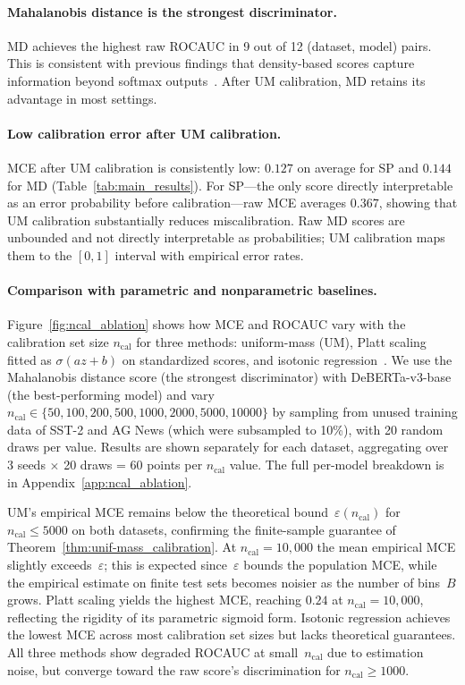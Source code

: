 \documentclass{article}
\theoremstyle{plain}
\theoremstyle{definition}
\theoremstyle{remark}
\begin{document}
\paragraph{Mahalanobis distance is the strongest discriminator.}
MD achieves the highest raw ROCAUC in 9 out of 12 (dataset, model) pairs.
This is consistent with previous findings that density-based scores capture information beyond softmax outputs~\citep{vazhentsev_uncertainty_2022}.
After UM calibration, MD retains its advantage in most settings.

\paragraph{Low calibration error after UM calibration.}
MCE after UM calibration is consistently low: $0.127$ on average for SP and $0.144$ for MD (Table~\ref{tab:main_results}).
For SP---the only score directly interpretable as an error probability before calibration---raw MCE averages $0.367$, showing that UM calibration substantially reduces miscalibration.
Raw MD scores are unbounded and not directly interpretable as probabilities; UM calibration maps them to the $[0,1]$ interval with empirical error rates.

\paragraph{Comparison with parametric and nonparametric baselines.}
Figure~\ref{fig:ncal_ablation} shows how MCE and ROCAUC vary with the calibration set size $n_{\mathrm{cal}}$ for three methods: uniform-mass (UM), Platt scaling~\citep{plat_scaling} fitted as $\sigma(a z + b)$ on standardized scores, and isotonic regression~\citep{isotonic}.
We use the Mahalanobis distance score (the strongest discriminator) with DeBERTa-v3-base (the best-performing model) and vary $n_{\mathrm{cal}} \in \{50, 100, 200, 500, 1000, 2000, 5000, 10000\}$ by sampling from unused training data of SST-2 and AG News (which were subsampled to 10\%), with 20 random draws per value.
Results are shown separately for each dataset, aggregating over 3 seeds $\times$ 20 draws = 60 points per $n_{\mathrm{cal}}$ value.
The full per-model breakdown is in Appendix~\ref{app:ncal_ablation}.

UM's empirical MCE remains below the theoretical bound~$\varepsilon(n_{\mathrm{cal}})$ for $n_{\mathrm{cal}} \leq 5000$ on both datasets, confirming the finite-sample guarantee of Theorem~\ref{thm:unif-mass_calibration}.
At $n_{\mathrm{cal}} = 10{,}000$ the mean empirical MCE slightly exceeds~$\varepsilon$; this is expected since~$\varepsilon$ bounds the population MCE, while the empirical estimate on finite test sets becomes noisier as the number of bins~$B$ grows.
Platt scaling yields the highest MCE, reaching $0.24$ at $n_{\mathrm{cal}} = 10{,}000$, reflecting the rigidity of its parametric sigmoid form.
Isotonic regression achieves the lowest MCE across most calibration set sizes but lacks theoretical guarantees.
All three methods show degraded ROCAUC at small~$n_{\mathrm{cal}}$ due to estimation noise, but converge toward the raw score's discrimination for $n_{\mathrm{cal}} \geq 1000$.
\end{document}
